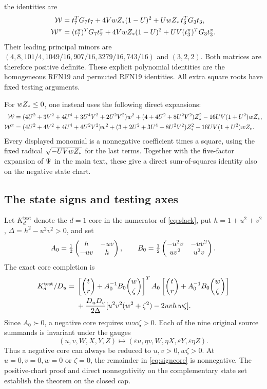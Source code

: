 the identities are
\begin{align}
 \mathcal W&=t_7^TG_7t_7+4VwZ_*(1-U)^2+UwZ_*\,t_3^TG_3t_3,\notag\\
 \mathcal W^\pi&=(t_7^\pi)^TG_7t_7^\pi+4VwZ_*(1-U)^2
                                      +UV(t_3^\pi)^TG_3t_3^\pi .
 \label{eq:W19}
\end{align}
Their leading principal minors are
$(4,8,101/4,1049/16,907/16,3279/16,743/16)$ and $(3,2,2)$.
Both matrices are therefore positive definite. These explicit polynomial
identities are the homogeneous RFN19 and permuted RFN19 identities.
All extra square roots have fixed testing arguments.

For $wZ_*\leq0$, one instead uses the following direct expansions:
\begin{align}
 \mathcal W={}&(4U^2+3V^2+4U^4+3U^4V^2+2U^2V^2)w^2
 +(4+4U^2+8U^2V^2)Z_*^2
             -16UV(1+U^2)wZ_*,\notag\\
 \mathcal W^\pi={}&(4U^2+4V^2+4U^4+4U^2V^2)w^2
 +(3+2U^2+3U^4+8U^2V^2)Z_*^2
             -16UV(1+U^2)wZ_* .
 \label{eq:negativeW}
\end{align}
Every displayed monomial is a nonnegative coefficient times a square,
using the fixed radical $\sqrt{-UVwZ_*}$ for the last terms.
Together with the five-factor expansion of $\Psi$ in the main text, these
give a direct sum-of-squares identity also on the negative state chart.

\subsection*{The state signs and testing axes}
Let $K_d^{\mathrm{test}}$ denote the $d=1$ core in the numerator
of \eqref{eq:slack}, put $h=1+u^2+v^2$,
$\Delta=h^2-u^2v^2>0$, and set
\[
 A_0=\tfrac12\begin{pmatrix}h&-uv\\-uv&h\end{pmatrix},\qquad
 B_0=\tfrac12\begin{pmatrix}-u^2v&-uv^2\\uv^2&u^2v\end{pmatrix}.
\]
The exact core completion is
\begin{align}
 K_d^{\mathrm{test}}/D_u
 ={}&\left[\binom tr+A_0^{-1}B_0\binom w\zeta\right]^TA_0
 \left[\binom tr+A_0^{-1}B_0\binom w\zeta\right]\notag\\
 &+\frac{D_uD_v}{2\Delta}
      [u^2v^2(w^2+\zeta^2)-2uvh\,w\zeta] .
 \label{eq:signcore}
\end{align}
Since $A_0\succ0$, a negative core requires $uvw\zeta>0$.
Each of the nine original source summands is invariant under the gauges
\[
 (u,v,W,X,Y,Z)\longmapsto
 (\varepsilon u,\eta v,W,\eta X,\varepsilon Y,\varepsilon\eta Z).
\]
Thus a negative core can always be reduced to $u,v>0,w\zeta>0$.
At $u=0,v=0,w=0$ or $\zeta=0$, the remainder in \eqref{eq:signcore}
is nonnegative. The positive-chart proof and direct nonnegativity on the
complementary state set establish the theorem on the closed cap.

